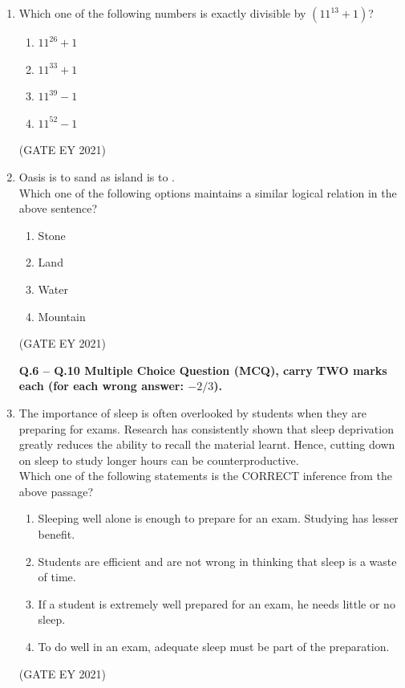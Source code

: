 \documentclass[journal]{IEEEtran}
\begin{document}
\begin{enumerate}
    \item Which one of the following numbers is exactly divisible by $(11^{13}+1)$?
    \begin{multicols}{2}
    \begin{enumerate}
        \item $11^{26}+1$
        \item $11^{33}+1$
        \item $11^{39}-1$
        \item $11^{52}-1$
    \end{enumerate}
    \end{multicols}
    \hfill{(GATE EY 2021)}

    \item Oasis is to sand as island is to \underline{\hspace{3cm}}. \\
    Which one of the following options maintains a similar logical relation in the above sentence?
    \begin{multicols}{2}
    \begin{enumerate}
        \item Stone
        \item Land
        \item Water
        \item Mountain
    \end{enumerate}
    \end{multicols}
    \hfill{(GATE EY 2021)}

\textbf{Q.6 -- Q.10 Multiple Choice Question (MCQ), carry TWO marks each (for each wrong answer: $-2/3$).}
 
    \item The importance of sleep is often overlooked by students when they are preparing for exams. Research has consistently shown that sleep deprivation greatly reduces the ability to recall the material learnt. Hence, cutting down on sleep to study longer hours can be counterproductive. \\
    Which one of the following statements is the CORRECT inference from the above passage?
    \begin{enumerate}
        \item Sleeping well alone is enough to prepare for an exam. Studying has lesser benefit.
        \item Students are efficient and are not wrong in thinking that sleep is a waste of time.
        \item If a student is extremely well prepared for an exam, he needs little or no sleep.
        \item To do well in an exam, adequate sleep must be part of the preparation.
    \end{enumerate}
    \hfill{(GATE EY 2021)}


\end{enumerate}
\end{document}

